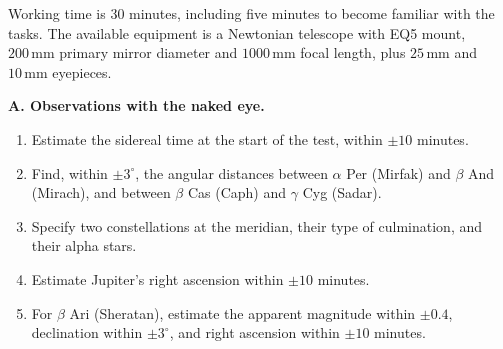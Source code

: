 Working time is 30 minutes, including five minutes to become familiar with
the tasks. The available equipment is a Newtonian telescope with EQ5 mount,
$200\,\mathrm{mm}$ primary mirror diameter and $1000\,\mathrm{mm}$ focal length,
plus $25\,\mathrm{mm}$ and $10\,\mathrm{mm}$ eyepieces.

\textbf{A. Observations with the naked eye.}
\begin{enumerate}
\item Estimate the sidereal time at the start of the test, within $\pm10$ minutes.
\item Find, within $\pm3^\circ$, the angular distances between
  $\alpha$ Per (Mirfak) and $\beta$ And (Mirach), and between $\beta$ Cas (Caph)
  and $\gamma$ Cyg (Sadar).
\item Specify two constellations at the meridian, their type of culmination,
  and their alpha stars.
\item Estimate Jupiter's right ascension within $\pm10$ minutes.
\item For $\beta$ Ari (Sheratan), estimate the apparent magnitude within
  $\pm0.4$, declination within $\pm3^\circ$, and right ascension within
  $\pm10$ minutes.
\end{enumerate}
